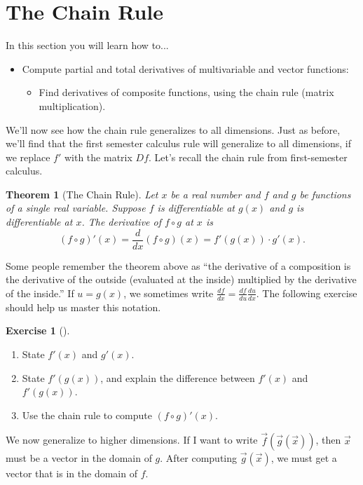 \documentclass[10pt,]{book}
\theoremstyle{plain}
\newtheorem{theorem}{Theorem}[section]
\theoremstyle{definition}
\theoremstyle{definition}
\theoremstyle{definition}
\theoremstyle{definition}
\newtheorem{exploration}[project]{Exercise}
\theoremstyle{definition}
\numberwithin{equation}{section}
\newcommand{\ds}{\displaystyle}
\begin{document}
\section[{The Chain Rule}]{The Chain Rule}\label{section-23}
In this section you will learn how to...%
\leavevmode%
\begin{itemize}[label=\textbullet]
\item{}Compute partial and total derivatives of multivariable and vector functions:%
%
\begin{itemize}[label=$\circ$]
\item{}Find derivatives of composite functions, using the chain rule (matrix multiplication).%
\end{itemize}
\end{itemize}
We'll now see how the chain rule generalizes to all dimensions. Just as before, we'll find that the first semester calculus rule will generalize to all dimensions, if we replace \(f'\) with the matrix \(Df\). Let's recall the chain rule from first-semester calculus.%
\begin{theorem}[{The Chain Rule}]\label{theorem-2}
Let \(x\) be a real number and \(f\) and \(g\) be functions of a single real variable. Suppose \(f\) is differentiable at \(g(x)\) and \(g\) is differentiable at \(x\). The derivative of \(f\circ g\) at \(x\) is%
\begin{equation*}
(f\circ g)'(x) = \frac{d}{dx}(f\circ g)(x) = f'(g(x))\cdot g'(x).
\end{equation*}
%
\end{theorem}
Some people remember the theorem above as ``the derivative of a composition is the derivative of the outside (evaluated at the inside) multiplied by the derivative of the inside.'' If \(u=g(x)\), we sometimes write \(\ds \frac{df}{dx}=\frac{df}{du}\frac{du}{dx}\). The following exercise should help us master this notation.%
\begin{exploration}[]\label{prob_chain_rule_review}
\leavevmode%
\begin{enumerate}[font=\bfseries,label=(\alph*),ref=\alph*]
\item\label{task-333} State \(f'(x)\) and \(g'(x)\).%
\item\label{task-334} State \(f'(g(x))\), and explain the difference between \(f'(x)\) and \(f'(g(x))\).%
\item\label{task-335} Use the chain rule to compute \((f\circ g)'(x)\).%
\end{enumerate}
\end{exploration}
We now generalize to higher dimensions. If I want to write \(\vec f(\vec g(\vec x))\), then \(\vec x\) must be a vector in the domain of \(g\). After computing \(\vec g(\vec x)\), we must get a vector that is in the domain of \(f\).%
\end{document}
